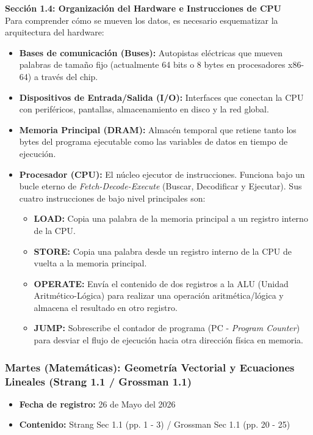 \documentclass[11pt, a4paper]{article}
\begin{document}
\noindent\textbf{Sección 1.4: Organización del Hardware e Instrucciones de CPU}\\[0.5em]
Para comprender cómo se mueven los datos, es necesario esquematizar la arquitectura del hardware:
\begin{itemize}
  \item \textbf{Bases de comunicación (Buses):} Autopistas eléctricas que mueven palabras de tamaño fijo (actualmente 64 bits o 8 bytes en procesadores x86-64) a través del chip.
  \item \textbf{Dispositivos de Entrada/Salida (I/O):} Interfaces que conectan la CPU con periféricos, pantallas, almacenamiento en disco y la red global.
  \item \textbf{Memoria Principal (DRAM):} Almacén temporal que retiene tanto los bytes del programa ejecutable como las variables de datos en tiempo de ejecución.
  \item \textbf{Procesador (CPU):} El núcleo ejecutor de instrucciones. Funciona bajo un bucle eterno de \textit{Fetch-Decode-Execute} (Buscar, Decodificar y Ejecutar). Sus cuatro instrucciones de bajo nivel principales son:
  \begin{itemize}
    \item \textbf{LOAD:} Copia una palabra de la memoria principal a un registro interno de la CPU.
    \item \textbf{STORE:} Copia una palabra desde un registro interno de la CPU de vuelta a la memoria principal.
    \item \textbf{OPERATE:} Envía el contenido de dos registros a la ALU (Unidad Aritmético-Lógica) para realizar una operación aritmética/lógica y almacena el resultado en otro registro.
    \item \textbf{JUMP:} Sobrescribe el contador de programa (PC - \textit{Program Counter}) para desviar el flujo de ejecución hacia otra dirección física en memoria.
  \end{itemize}
\end{itemize}

\subsubsection{Martes (Matemáticas): Geometría Vectorial y Ecuaciones Lineales (Strang 1.1 / Grossman 1.1)}
\begin{itemize}
  \item[] \textbf{Fecha de registro:} 26 de Mayo del 2026
  \item[] \textbf{Contenido:} Strang Sec 1.1 (pp. 1 - 3) / Grossman Sec 1.1 (pp. 20 - 25)
\end{itemize}
\end{document}
